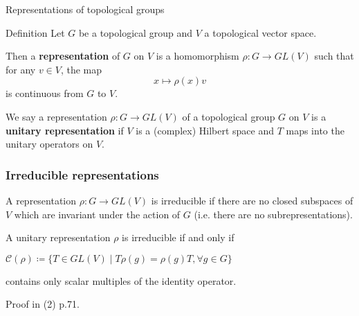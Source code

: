 \documentclass[mathserif
, handout
]{beamer}
\begin{document}
\begin{frame}{Representations of topological groups}
    \begin{block}{Definition}
        Let $G$ be a topological group and $V$ a topological vector space.
        
        Then a \textbf{representation} of $G$ on $V$ is a %
        homomorphism $\rho\colon G\to GL(V)$ such that for any $v\in V$, the map \[x\mapsto \rho(x)v\] is continuous from $G$ to $V$. %
    \end{block} 
    \pause

    We say a representation $\rho\colon G\to GL(V)$ of a topological group $G$ on $V$ is a \textbf{unitary representation} if $V$ is a (complex) Hilbert space and $T$ maps into the unitary operators on $V$. %
\end{frame}

\begin{frame}
    \frametitle{Irreducible representations}
    A representation $\rho\colon G\to GL(V)$ is irreducible if there are no closed subspaces of $V$ which are invariant under the action of $G$ (i.e. there are no subrepresentations).
    \pause

    \begin{Theorem}
        A unitary representation $\rho$ is irreducible if and only if \begin{center}
            $\mathcal{C}(\rho)\coloneqq \{T\in GL(V)\mid T\rho(g) = \rho(g) T,\forall g\in G\}$
        \end{center} %
        contains only scalar multiples of the identity operator.
    \end{Theorem} Proof in (2) p.71.
\end{frame}
\end{document}
